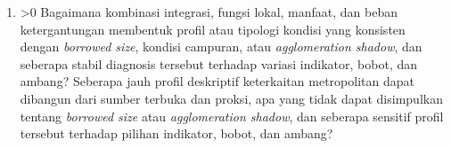 \documentclass[11pt]{article}
\newcounter{available}
\begin{document}
{{{{{{\begin{enumerate}
                  \else
                    Bagaimana fungsi lokal dapat dibaca secara terbatas melalui proksi terbuka ketika data Podes, pekerjaan, dan tabulasi pemerintah daerah tidak tersedia?
                  \fi
                \fi
              \fi
              \item
              \ifnum\value{available}>0
                Bagaimana kombinasi integrasi, fungsi lokal, manfaat, dan beban ketergantungan membentuk profil atau tipologi kondisi yang konsisten dengan \textit{borrowed size}, kondisi campuran, atau \textit{agglomeration shadow}, dan seberapa stabil diagnosis tersebut terhadap variasi indikator, bobot, dan ambang?
              \else
                Seberapa jauh profil deskriptif keterkaitan metropolitan dapat dibangun dari sumber terbuka dan proksi, apa yang tidak dapat disimpulkan tentang \textit{borrowed size} atau \textit{agglomeration shadow}, dan seberapa sensitif profil tersebut terhadap pilihan indikator, bobot, dan ambang?
              \fi
            \end{enumerate}

}}}}}}
\end{document}
